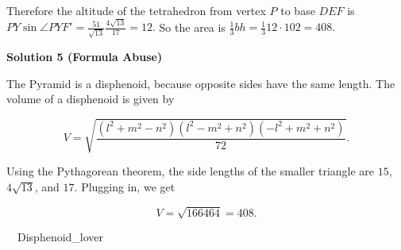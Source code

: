 \begin{enumerate}
 Therefore the altitude of the tetrahedron from vertex $P$ to base $DEF$ is $PY \sin{\angle PYF'} = \frac{51}{\sqrt{13}} \frac{4 \sqrt{13}}{17} = 12.$ So the area is $\frac{1}{3}bh = \frac{1}{3} 12 \cdot 102 = \boxed{408}.$




\textbf{Solution 5 (Formula Abuse)}

The Pyramid is a disphenoid, because opposite sides have the same length. The volume of a disphenoid is given by 

 
 \[V = \sqrt{\frac{(l^{2}+m^{2}-n^{2})(l^{2}-m^{2}+n^{2})(-l^{2}+m^{2}+n^{2})}{72}}.\]

 Using the Pythagorean theorem, the side lengths of the smaller triangle are \(15\), \(4\sqrt{13}\), and \(17\). Plugging in, we get 

 
 \[V = \sqrt{166464} = \boxed{408}.\]

 ~~Disphenoid\_lover

 


\end{enumerate}